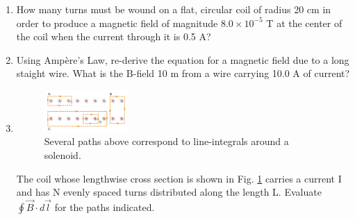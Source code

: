 \documentclass[10pt]{article}
\begin{document}
\begin{enumerate}
\begin{enumerate}
\item How many turns must be wound on a flat, circular coil of radius 20 cm in order to produce a magnetic field of magnitude $8.0 \times 10^{-5}$ T at the center of the coil when the current through it is 0.5 A? \\ \vspace{1.5cm}
\item Using Amp\`{e}re's Law, re-derive the equation for a magnetic field due to a long staight wire.  What is the B-field 10 m from a wire carrying 10.0 A of current? \\ \vspace{3 cm}
\clearpage
\item
\begin{figure}[hb]
\centering
\includegraphics[width=0.3\textwidth]{circuit2.png}
\caption{\label{fig:circuit2} Several paths above correspond to line-integrals around a solenoid.}
\end{figure}
The coil whose lengthwise cross section is shown in Fig. \ref{fig:circuit2} carries a current I and has N evenly spaced turns distributed along the length L. Evaluate $\oint \vec{B} \cdot d\vec{l}$ for the paths indicated.
\end{enumerate}
\end{enumerate}
\end{document}
